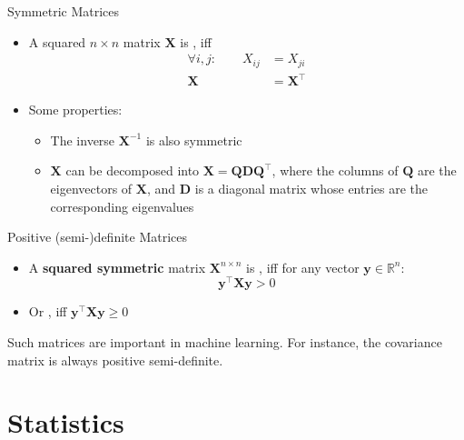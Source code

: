 \begin{frame}{Symmetric Matrices}{}
	\begin{itemize}
		\item A squared $n \times n$ matrix $\bm{X}$ is , iff
		\begin{align}
			\forall i, j: \qquad X_{ij}
				&= X_{ji} \\
			\bm{X}
				&= \bm{X}^{\intercal}
		\end{align}
		\item Some properties:
		\begin{itemize}
			\item The inverse $\bm{X}^{-1}$ is also symmetric
			\item {} $\bm{X}$ can be decomposed into $\bm{X} = \bm{Q} \bm{D} \bm{Q}^{\intercal}$,
				where the columns of $\bm{Q}$ are the eigenvectors of $\bm{X}$, and $\bm{D}$ is a diagonal matrix whose
				entries are the corresponding eigenvalues
		\end{itemize}
	\end{itemize}
\end{frame}


\begin{frame}{Positive (semi-)definite Matrices}{}
	\begin{itemize}
		\item A \textbf{squared symmetric} matrix $\bm{X}^{n \times n}$ is ,
			iff for any vector $\bm{y} \in \mathbb{R}^n$:
		\begin{equation}
			\bm{y}^{\intercal} \bm{X} \bm{y} > 0
		\end{equation}
		\item Or , iff $\bm{y}^{\intercal} \bm{X} \bm{y} \ge 0$
	\end{itemize}
	
	\vspace*{3mm}
	\begin{boxBlueNoFrame}
		Such matrices are important in machine learning. For instance, the covariance matrix is always positive semi-definite.
	\end{boxBlueNoFrame}
\end{frame}


\section{Statistics}

